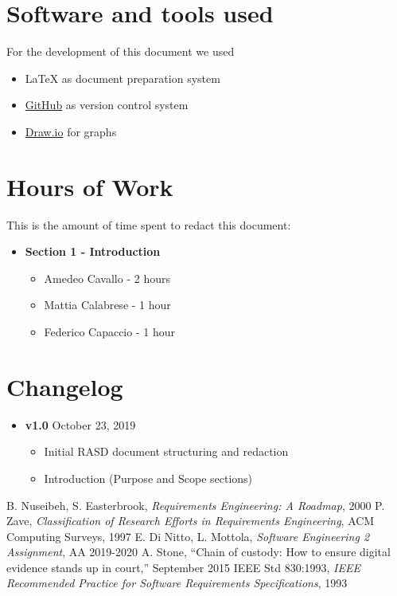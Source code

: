 \begin{appendices}
	\section{Software and tools used}
	For the development of this document we used
	\begin{itemize}
		\item \LaTeX{} as document preparation system
		\item \href{http://github.com}{GitHub} as version control system
		\item \href{http://draw.io}{Draw.io} for graphs
	\end{itemize}
		
	\section{Hours of Work}
	This is the amount of time spent to redact this document:
	\begin{itemize}
		\item \textbf{Section 1 - Introduction}
		\begin{itemize}
			\item Amedeo Cavallo - 2 hours
			\item Mattia Calabrese - 1 hour
			\item Federico Capaccio - 1 hour
		\end{itemize}
	\end{itemize}
	
	\section{Changelog}
	\begin{itemize}
		\item \textbf{v1.0} October 23, 2019
		\begin{itemize}
			\item Initial RASD document structuring and redaction
			\item Introduction (Purpose and Scope sections)
		\end{itemize}
	\end{itemize}
\end{appendices}

\clearpage

\begin{thebibliography}{9}

B. Nuseibeh, S. Easterbrook, \emph{Requirements Engineering: A Roadmap}, 2000
P. Zave, \emph{Classification of Research Efforts in Requirements
Engineering}, ACM Computing Surveys, 1997
 E. Di Nitto, L. Mottola, \emph{Software Engineering 2 Assignment}, AA 2019-2020
 A. Stone, “Chain of custody: How to ensure digital evidence stands up in court,” September 2015
IEEE Std 830:1993, \emph{IEEE Recommended Practice for Software Requirements Specifications}, 1993

\end{thebibliography}
